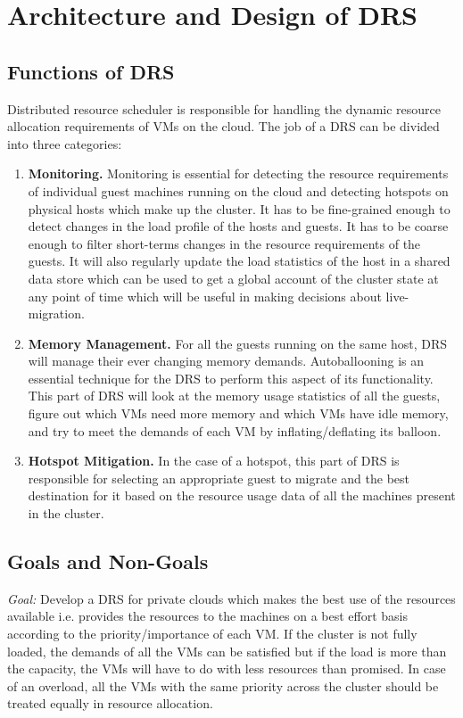 \chapter{Architecture and Design of DRS}
\label{chap:design}

\section{Functions of DRS}
Distributed resource scheduler is responsible for handling the dynamic resource allocation requirements of VMs on the cloud. The job of a DRS can be divided into three categories:

\begin{enumerate}
\item \textbf{Monitoring.} Monitoring is essential for detecting the resource requirements of individual guest machines running on the cloud and detecting hotspots on physical hosts which make up the cluster. It has to be fine-grained enough to detect changes in the load profile of the hosts and guests. It has to be coarse enough to filter short-terms changes in the resource requirements of the guests. It will also regularly update the load statistics of the host in a shared data store which can be used to get a global account of the cluster state at any point of time which will be useful in making decisions about live-migration.
\item \textbf{Memory Management.} For all the guests running on the same host, DRS will manage their ever changing memory demands. Autoballooning is an essential technique for the DRS to perform this aspect of its functionality. This part of DRS will look at the memory usage statistics of all the guests, figure out which VMs need more memory and which VMs have idle memory, and try to meet the demands of each VM by inflating/deflating its balloon.
\item \textbf{Hotspot Mitigation.} In the case of a hotspot, this part of DRS is responsible for selecting an appropriate guest to migrate and the best destination for it based on the resource usage data of all the machines present in the cluster.
\end{enumerate}

\section{Goals and Non-Goals}
\textit{Goal:} Develop a DRS for private clouds which makes the best use of the resources available i.e. provides the resources to the machines on a best effort basis according to the priority/importance of each VM. If the cluster is not fully loaded, the demands of all the VMs can be satisfied but if the load is more than the capacity, the VMs will have to do with less resources than promised. In case of an overload, all the VMs with the same priority across the cluster should be treated equally in resource allocation. 

